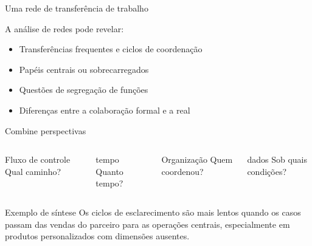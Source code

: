 \documentclass[aspectratio=169,11pt]{beamer}
\begin{document}
\begin{frame}{Uma rede de transferência de trabalho}
  \centering
  \vspace{0.45cm}
  A análise de redes pode revelar:
  \begin{itemize}
    \item Transferências frequentes e ciclos de coordenação
    \item Papéis centrais ou sobrecarregados
    \item Questões de segregação de funções
    \item Diferenças entre a colaboração formal e a real
  \end{itemize}
\end{frame}

\begin{frame}{Combine perspectivas}
  \begin{columns}[T,onlytextwidth]
      \begin{block}{Fluxo de controle}
        Qual caminho?
      \end{block}
      \begin{block}{tempo}
        Quanto tempo?
      \end{block}
      \begin{block}{Organização}
        Quem coordenou?
      \end{block}
      \begin{block}{dados}
        Sob quais condições?
      \end{block}
  \end{columns}
  \vspace{0.55cm}
  \begin{block}{Exemplo de síntese}
    Os ciclos de esclarecimento são mais lentos quando os casos passam das vendas do parceiro para as operações centrais, especialmente em produtos personalizados com dimensões ausentes.
  \end{block}
\end{frame}
\end{document}
